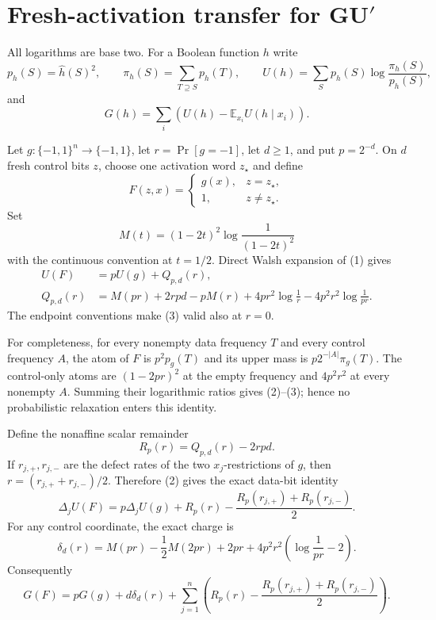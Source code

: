 \section*{Fresh-activation transfer for GU$'$}

All logarithms are base two.  For a Boolean function $h$ write
\[
 p_h(S)=\widehat h(S)^2,\qquad
 \pi_h(S)=\sum_{T\supseteq S}p_h(T),\qquad
 U(h)=\sum_Sp_h(S)\log\frac{\pi_h(S)}{p_h(S)},
\]
and
\[
 G(h)=\sum_i\left(U(h)-\mathbb E_{x_i}U(h\mid x_i)\right).
\]

Let $g:\{-1,1\}^n\to\{-1,1\}$, let
$r=\Pr[g=-1]$, let $d\geq1$, and put $p=2^{-d}$.  On $d$ fresh
control bits $z$, choose one activation word $z_\star$ and define
\[
 F(z,x)=\begin{cases}g(x),&z=z_\star,\\1,&z\ne z_\star.\end{cases}
 \tag{1}
\]
Set
\[
 M(t)=(1-2t)^2\log\frac1{(1-2t)^2}
\]
with the continuous convention at $t=1/2$.  Direct Walsh expansion of
(1) gives
\begin{align}
 U(F)&=pU(g)+Q_{p,d}(r),                                      \tag{2}\\
 Q_{p,d}(r)&=M(pr)+2rpd-pM(r)
 +4pr^2\log\frac1r-4p^2r^2\log\frac1{pr}.                  \tag{3}
\end{align}
The endpoint conventions make (3) valid also at $r=0$.

For completeness, for every nonempty data frequency $T$ and every control
frequency $A$, the atom of $F$ is $p^2p_g(T)$ and its upper mass is
$p2^{-|A|}\pi_g(T)$.  The control-only atoms are $(1-2pr)^2$ at the empty
frequency and $4p^2r^2$ at every nonempty $A$.  Summing their logarithmic
ratios gives (2)--(3); hence no probabilistic relaxation enters this
identity.

Define the nonaffine scalar remainder
\[
 R_p(r)=Q_{p,d}(r)-2rpd.                                      \tag{4}
\]
If $r_{j,+},r_{j,-}$ are the defect rates of the two $x_j$-restrictions of
$g$, then $r=(r_{j,+}+r_{j,-})/2$.  Therefore (2) gives the exact data-bit
identity
\[
 \Delta_jU(F)=p\Delta_jU(g)+R_p(r)
 -\frac{R_p(r_{j,+})+R_p(r_{j,-})}{2}.                       \tag{5}
\]
For any control coordinate, the exact charge is
\[
 \delta_d(r)=M(pr)-\frac12M(2pr)+2pr
 +4p^2r^2\left(\log\frac1{pr}-2\right).                     \tag{6}
\]
Consequently
\[
 G(F)=pG(g)+d\delta_d(r)+\sum_{j=1}^n
 \left(R_p(r)-\frac{R_p(r_{j,+})+R_p(r_{j,-})}{2}\right).   \tag{7}
\]

